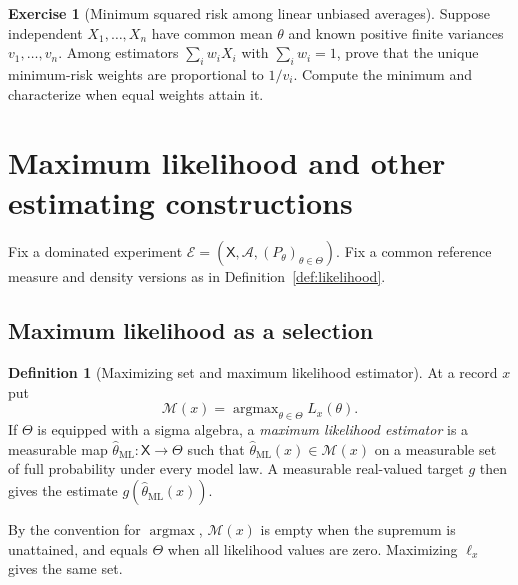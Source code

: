 \documentclass[11pt,oneside]{book}
\theoremstyle{definition}
\newtheorem{definition}[theorem]{Definition}
\newtheorem{exercise}{Exercise}[section]
\theoremstyle{remark}
\DeclareMathOperator{\argmax}{argmax}
\begin{document}
\begin{exercise}[Minimum squared risk among linear unbiased averages]
\label{exer:mse-heteroscedastic-weighted-average}
Suppose independent $X_1,\ldots,X_n$ have common mean $\theta$
and known positive finite variances $v_1,\ldots,v_n$. Among
estimators $\sum_i w_iX_i$ with $\sum_i w_i=1$, prove that the
unique minimum-risk weights are proportional to $1/v_i$.
Compute the minimum and characterize when equal weights attain it.
\end{exercise}



\clearpage
\section{Maximum likelihood and other estimating constructions}
\label{sec:estimator-constructions}

Fix a dominated experiment $\mathcal E=(\mathsf X,\mathcal A,
(P_\theta)_{\theta\in\Theta})$. Fix a common reference measure and
density versions as in Definition~\ref{def:likelihood}.

\subsection{Maximum likelihood as a selection}
\label{subsec:maximum-likelihood-selection}

\begin{definition}[Maximizing set and maximum likelihood estimator]
\label{def:maximum-likelihood-estimator}
At a record $x$ put
\[
\mathcal M(x)=\argmax_{\theta\in\Theta}L_x(\theta).
\]
If $\Theta$ is equipped with a sigma algebra, a \emph{maximum
likelihood estimator} is a measurable map
$\widehat\theta_{\mathrm{ML}}:\mathsf X\to\Theta$ such that
$\widehat\theta_{\mathrm{ML}}(x)\in\mathcal M(x)$ on a measurable
set of full probability under every model law. A measurable
real-valued target $g$ then gives the estimate
$g(\widehat\theta_{\mathrm{ML}}(x))$.
\end{definition}

By the convention for $\argmax$, $\mathcal M(x)$ is empty when the
supremum is unattained, and equals $\Theta$ when all likelihood
values are zero. Maximizing $\ell_x$ gives the same set.
\end{document}
